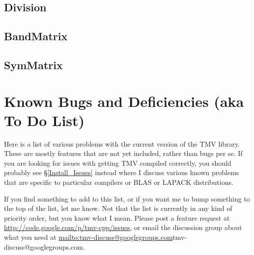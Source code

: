 \documentclass[twoside,letterpaper,11pt]{article}
\makeatletter
\newcommand{\mygroupx}{tmv-discuss@googlegroups.com}
\newcommand{\mygroup}{\url{mailto:\mygroupx}{\mygroupx}}
\newcommand{\myissuesx}{http://code.google.com/p/tmv-cpp/issues}
\newcommand{\myissues}{\url{\myissuesx}}
\newcommand{\inputcode}[1]{}
\makeatother
\begin{document}
\inputcode{../examples/Matrix.cpp}
%
%
\vspace{12pt}

\newpage
\subsection{Division}

\inputcode{../examples/Division.cpp}
%
%
\vspace{12pt}

\newpage
\subsection{BandMatrix}

\inputcode{../examples/BandMatrix.cpp}
%
%
\vspace{12pt}

\newpage
\subsection{SymMatrix}

\inputcode{../examples/SymMatrix.cpp}
%
%


\newpage
\section{Known Bugs and Deficiencies (aka To Do List)}
\label{Bugs}

Here is a list of various problems with the current version of the TMV library.
These are mostly features that are not yet included, rather than bugs per se.
If you are looking for issues with getting TMV compiled correctly, you should
probably see \S\ref{Install_Issues} instead where I discuss various known
problems that are specific to particular compilers or BLAS or LAPACK 
distributions.  

If you find something to add to this list, or if you want me to bump something
to the top of the list, let me know.  Not that the list is currently in any kind of 
priority order, but you know what I mean.  Please post a feature request
at \myissues, or email the discussion group about what you need at \mygroup.
\end{document}
